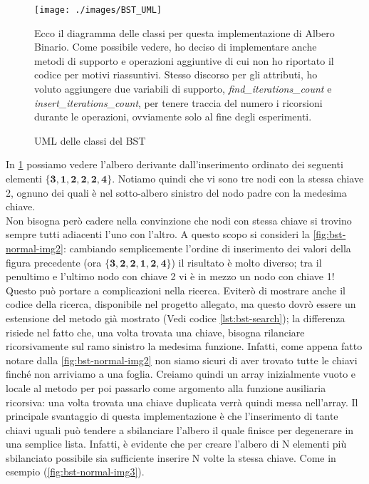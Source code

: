 \documentclass{article}
\begin{document}
\begin{figure}[htbp]
  \begin{minipage}{0.5\textwidth}
    \centering
    \texttt{[image: ./images/BST\_UML]}
    \caption{UML delle classi del BST}
    \label{fig:bst-normal-img1}
  \end{minipage}%
    \hspace{\columnsep}
      \hspace{\columnsep}
  \begin{minipage}{0.5\textwidth}
Ecco il diagramma delle classi per questa implementazione di Albero Binario. Come possibile vedere, ho deciso di implementare anche metodi di supporto e operazioni aggiuntive di cui non ho riportato il codice per motivi riassuntivi.
Stesso discorso per gli attributi, ho voluto aggiungere due variabili di supporto, \textit{find\_iterations\_count} e    \textit{insert\_iterations\_count}, per tenere traccia del numero i ricorsioni durante le operazioni, ovviamente solo al fine degli esperimenti.
  \end{minipage}
\end{figure}




In \cref{fig:bst-normal-img1} possiamo vedere l'albero derivante dall'inserimento ordinato dei seguenti elementi \(\mathbf{\{3, 1, 2, 2, 2, 4\}}\). Notiamo quindi che vi sono tre nodi con la stessa chiave 2, ognuno dei quali è nel sotto-albero sinistro del nodo padre con la medesima chiave.
\\
Non bisogna però cadere nella convinzione che nodi con stessa chiave si trovino sempre tutti adiacenti l'uno con l'altro.
A questo scopo si consideri la \cref{fig:bst-normal-img2}:  cambiando semplicemente l'ordine di inserimento dei valori della figura precedente (ora \(\mathbf{\{3, 2, 2, 1, 2, 4\}}\)) il risultato è molto diverso; tra il penultimo e l'ultimo nodo con chiave 2 vi è in mezzo un nodo con chiave 1!
Questo può portare a complicazioni nella ricerca.
Eviterò di mostrare anche il codice della ricerca, disponibile nel progetto allegato, ma questo dovrò essere un estensione del metodo già mostrato (Vedi codice \ref{lst:bst-search}); la differenza risiede nel fatto che, una volta trovata una chiave, bisogna rilanciare ricorsivamente sul ramo sinistro la medesima funzione. Infatti, come appena fatto notare dalla \cref{fig:bst-normal-img2} non siamo sicuri di aver trovato tutte le chiavi finché non arriviamo a una foglia. Creiamo quindi un array inizialmente vuoto e locale al metodo per poi passarlo come argomento alla funzione ausiliaria ricorsiva: una volta trovata una chiave duplicata verrà quindi messa nell'array. 
Il principale svantaggio di questa implementazione è che l'inserimento di tante chiavi uguali può tendere a sbilanciare l'albero il quale finisce per degenerare in una semplice lista. Infatti, è evidente che per creare l'albero di N elementi più sbilanciato possibile sia sufficiente inserire N volte la stessa chiave. Come in esempio (\cref{fig:bst-normal-img3}).
\end{document}
